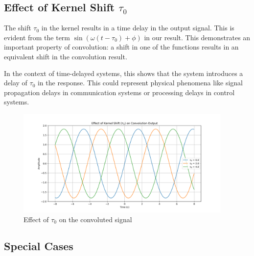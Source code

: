 \subsection{Effect of Kernel Shift $\tau_0$}

The shift $\tau_0$ in the kernel results in a time delay in the output signal. This is evident from the term $\sin(\omega(t-\tau_0) + \phi)$ in our result. This demonstrates an important property of convolution: a shift in one of the functions results in an equivalent shift in the convolution result.

In the context of time-delayed systems, this shows that the system introduces a delay of $\tau_0$ in the response. This could represent physical phenomena like signal propagation delays in communication systems or processing delays in control systems.

\begin{figure}[!ht]
    \begin{center}
        \includegraphics[width=0.95\textwidth]{codes/codes_sin_3_and_smoothening/figs/varying_tau_effect.png}
    \end{center}
    \caption{Effect of $\tau_0$ on the convoluted signal}
\end{figure}
\FloatBarrier

\subsection{Special Cases}

